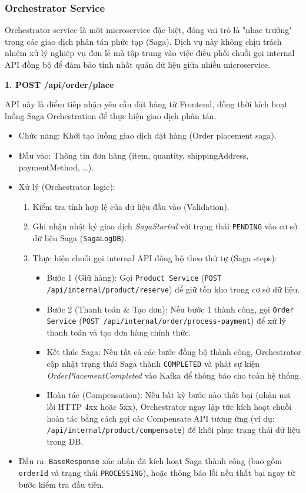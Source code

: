 \subsubsection{Orchestrator Service}

Orchestrator service là một microservice đặc biệt, đóng vai trò là "nhạc trưởng" trong các giao dịch phân tán phức tạp (Saga). Dịch vụ này không chịu trách nhiệm xử lý nghiệp vụ đơn lẻ mà tập trung vào việc điều phối chuỗi gọi internal API đồng bộ để đảm bảo tính nhất quán dữ liệu giữa nhiều microservice.

\textbf{1. POST /api/order/place}

API này là điểm tiếp nhận yêu cầu đặt hàng từ Frontend, đồng thời kích hoạt luồng Saga Orchestration để thực hiện giao dịch phân tán.

\begin{itemize}
    \item Chức năng: Khởi tạo luồng giao dịch đặt hàng (Order placement saga).
    \item Đầu vào: Thông tin đơn hàng (item, quantity, shippingAddress, paymentMethod, \dots).
    \item Xử lý (Orchestrator logic):
    \begin{enumerate}
        \item Kiểm tra tính hợp lệ của dữ liệu đầu vào (Validation).
        \item Ghi nhận nhật ký giao dịch \textit{SagaStarted} với trạng thái \texttt{PENDING} vào cơ sở dữ liệu Saga (\texttt{SagaLogDB}).
        \item Thực hiện chuỗi gọi internal API đồng bộ theo thứ tự (Saga steps): 
        \begin{itemize}
            \item Bước 1 (Giữ hàng): Gọi \texttt{Product Service} (\texttt{POST /api/internal/product/reserve}) để giữ tồn kho trong cơ sở dữ liệu.
            \item Bước 2 (Thanh toán \& Tạo đơn): Nếu bước 1 thành công, gọi \texttt{Order Service} (\texttt{POST /api/internal/order/process-payment}) để xử lý thanh toán và tạo đơn hàng chính thức.
            \item Kết thúc Saga: Nếu tất cả các bước đồng bộ thành công, Orchestrator cập nhật trạng thái Saga thành \texttt{COMPLETED} và phát sự kiện \textit{OrderPlacementCompleted} vào Kafka để thông báo cho toàn hệ thống.
            \item Hoàn tác (Compensation): Nếu bất kỳ bước nào thất bại (nhận mã lỗi HTTP 4xx hoặc 5xx), Orchestrator ngay lập tức kích hoạt chuỗi hoàn tác bằng cách gọi các Compensate API tương ứng (ví dụ: \texttt{/api/internal/product/compensate}) để khôi phục trạng thái dữ liệu trong DB.
        \end{itemize}
    \end{enumerate}
    \item Đầu ra: \texttt{BaseResponse} xác nhận đã kích hoạt Saga thành công (bao gồm \texttt{orderId} và trạng thái \texttt{PROCESSING}), hoặc thông báo lỗi nếu thất bại ngay từ bước kiểm tra đầu tiên.
\end{itemize}
